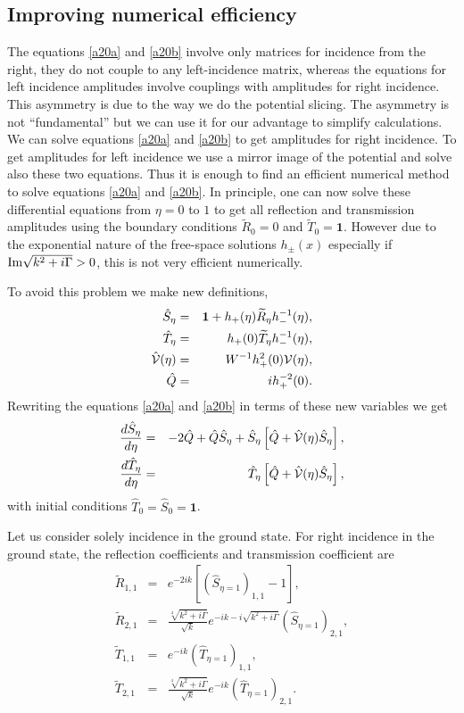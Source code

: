 \subsection{Improving numerical efficiency}
%
{The equations \eqref{a20a} and \eqref{a20b}} involve only  matrices for incidence from the right, they  do not couple to any left-incidence matrix, whereas the equations for left incidence
amplitudes involve couplings with amplitudes for right incidence. This asymmetry is due to the way we do the potential slicing. The asymmetry  is not ``fundamental''
but we can use it for our advantage to simplify calculations. We can solve equations \eqref{a20a} and \eqref{a20b} to get amplitudes for right incidence.
To get amplitudes for left incidence we use a mirror image of the potential and solve also these two equations.
Thus it is enough to find an efficient numerical method to solve equations \eqref{a20a} and \eqref{a20b}.
In principle, one can now solve these differential equations from $\eta=0$ to $1$ to get all reflection and transmission amplitudes using the boundary conditions $\widetilde{R}_{0}=0$ and $\widetilde{T}_{0}=\mathbf{1}$. However due to the exponential nature of the
free-space solutions $h_{\pm}(x)$ especially if ${\rm Im}\sqrt{k^2+i \Gamma}>0$, this is not very efficient numerically.

To avoid this problem we make new definitions,
%
\begin{eqnarray}
	\hat{S}_{\eta}&=&\mathbf{1}+h_{+}(\eta)\widetilde{R}_{\eta}h_{-}^{-1}(\eta),
	\nonumber\\
	\hat{T}_{\eta}&=&h_{+}(0)\widetilde{T}_{\eta}h_{-}^{-1}(\eta),
	\nonumber\\
	\hat{\cal V}(\eta)&=&W^{-1}h_{+}^{2}(0){\cal V}(\eta),
	\nonumber\\
	\hat{Q}&=&i h_{+}^{-2}(0).
\end{eqnarray}
%
Rewriting {the equations \eqref{a20a} and \eqref{a20b}} in terms of these new variables we get
%
\begin{eqnarray}
	\frac{d \hat{S}_{\eta}}{d \eta}&=&-2 \hat{Q}+\hat{Q}\hat{S}_{\eta}+\hat{S}_{\eta}\left[\hat{Q}+\hat{\cal V}(\eta)\hat{S}_{\eta}\right],
	\nonumber\\
	\frac{d \hat{T}_{\eta}}{d \eta}&=& \hat{T}_{\eta}\left[\hat{Q}+\hat{\cal V}(\eta)\hat{S}_{\eta}\right],
\end{eqnarray}
%
with initial conditions $\hat{T}_{0} =\hat{S}_{0}=\mathbf{1}$.

Let us consider solely incidence in the ground state. For right incidence in the ground state,
the reflection coefficients and transmission coefficient are
%
\begin{eqnarray}
	\widetilde R_{1,1} &=& e^{-2ik} \left[(\hat S_{\eta=1})_{1,1} - 1 \right],
	\nonumber\\
	\widetilde R_{2,1} &=&
	\frac{\sqrt[4]{k^2+i \Gamma}}{\sqrt{k}} e^{-ik-i\sqrt{k^2+i \Gamma}} (\hat S_{\eta=1})_{2,1},
	\nonumber\\
	\widetilde T_{1,1} &=& e^{-i k} (\hat T_{\eta=1})_{1,1},
	\nonumber\\
	\widetilde T_{2,1} &=& \frac{\sqrt[4]{k^2+i \Gamma}}{\sqrt{k}} e^{-i k} (\hat T_{\eta=1})_{2,1}.
\end{eqnarray}
\vspace*{1cm}


